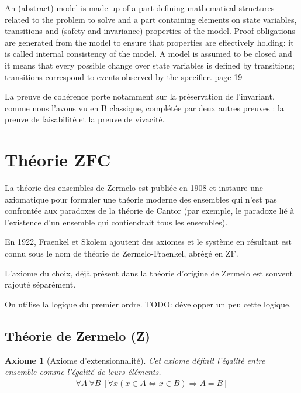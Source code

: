 \documentclass[10pt,a4paper]{article}
\newtheorem{axiom}{Axiome}[section]
\begin{document}
An (abstract) model is made up of a part defining mathematical structures
related to the problem to solve and a part containing elements on state variables,
transitions and (safety and invariance) properties of the model. Proof obligations
are generated from the model to ensure that properties are effectively holding: it
is called internal consistency of the model. A model is assumed to be closed and
it means that every possible change over state variables is defined by transitions;
transitions correspond to events observed by the specifier.
page 19


La preuve de cohérence porte
notamment sur la préservation de l'invariant, comme nous l’avons
vu en B classique, complétée par deux autres preuves : la preuve
de faisabilité et la preuve de vivacité.\cite{dossierTechnique}
\fi

\appendix

\section{Théorie ZFC}
\label{ZFC}
La théorie des ensembles de Zermelo est publiée en 1908 et instaure une axiomatique pour formuler une théorie moderne des ensembles qui n'est pas confrontée aux paradoxes de la théorie de Cantor (par exemple, le paradoxe lié à l'existence d'un ensemble qui contiendrait tous les ensembles).

En 1922, Fraenkel et Skolem ajoutent des axiomes et le système en résultant est connu sous le nom de théorie de Zermelo-Fraenkel, abrégé en ZF.

L'axiome du choix, déjà présent dans la théorie d'origine de Zermelo est souvent rajouté séparément.

On utilise la logique du premier ordre.
TODO: développer un peu cette logique.

\subsection{Théorie de Zermelo (Z)}

\begin{axiom}[Axiome d'extensionnalité] Cet axiome définit l'égalité entre ensemble comme l'égalité de leurs éléments.
\begin{align}
\forall A\ \forall B \
\left[ 
\forall x \left( x \in A \Leftrightarrow x \in B  \right) \Rightarrow A = B
\right] 
\end{align}
\end{axiom}
\end{document}
